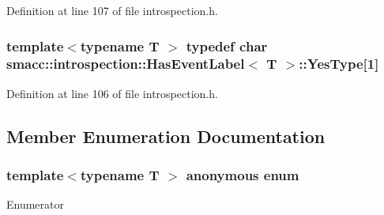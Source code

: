 Definition at line 107 of file introspection.\+h.

\subsubsection[{\texorpdfstring{Yes\+Type}{YesType}}]{\setlength{\rightskip}{0pt plus 5cm}template$<$typename T $>$ typedef char {\bf smacc\+::introspection\+::\+Has\+Event\+Label}$<$ T $>$\+::Yes\+Type\mbox{[}1\mbox{]}\hspace{0.3cm}{\ttfamily [private]}}\hypertarget{classsmacc_1_1introspection_1_1HasEventLabel_a8d4b4c2ecb640812e11e8c1407636b6a}{}\label{classsmacc_1_1introspection_1_1HasEventLabel_a8d4b4c2ecb640812e11e8c1407636b6a}


Definition at line 106 of file introspection.\+h.



\subsection{Member Enumeration Documentation}
\subsubsection[{\texorpdfstring{anonymous enum}{anonymous enum}}]{\setlength{\rightskip}{0pt plus 5cm}template$<$typename T $>$ anonymous enum}\hypertarget{classsmacc_1_1introspection_1_1HasEventLabel_a2de6073f80d42739c5ed78d301bd853b}{}\label{classsmacc_1_1introspection_1_1HasEventLabel_a2de6073f80d42739c5ed78d301bd853b}
\begin{Desc}
\item[Enumerator]\par
\begin{description}
\item[{\em 
value\hypertarget{classsmacc_1_1introspection_1_1HasEventLabel_a2de6073f80d42739c5ed78d301bd853ba3f57db3ac5b424aedec54eb89e48b732}{}\label{classsmacc_1_1introspection_1_1HasEventLabel_a2de6073f80d42739c5ed78d301bd853ba3f57db3ac5b424aedec54eb89e48b732}
}]\end{description}
\end{Desc}


